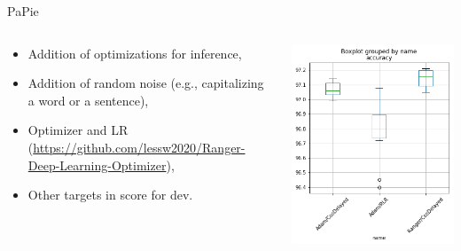 \documentclass[aspectratio=169]{beamer}
\begin{document}
\begin{frame}{PaPie}
    \begin{columns}
        \begin{column}{0.6\textwidth}
            \begin{itemize}
                \item Addition of optimizations for inference,
                \item Addition of random noise (e.g., capitalizing a word or a sentence),
                \item Optimizer and LR ({\small\url{https://github.com/lessw2020/Ranger-Deep-Learning-Optimizer}}),
                \item Other targets in score for dev.
            \end{itemize}
        \end{column}
        \begin{column}{0.4\textwidth}
        \vspace{1em}
            \includegraphics[width=\linewidth]{nlp-for-ch/images/boxplot_accuracy_ranger.png}
        \end{column}
    \end{columns}
\end{frame}
\end{document}
